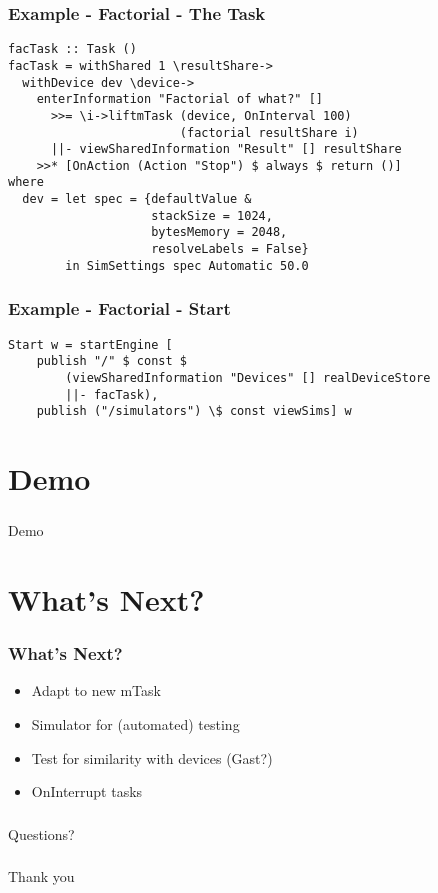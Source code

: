 \documentclass[department=icis, notes={show notes}, slidesperpage=1, official=true,showdate=true,slidenumbers=relative]{beamerruhuisstijl}
\begin{document}
\begin{frame}[fragile]
  \frametitle{Example - Factorial - The Task}
  \begin{lstlisting}
facTask :: Task ()
facTask = withShared 1 \resultShare->
  withDevice dev \device->
    enterInformation "Factorial of what?" []
      >>= \i->liftmTask (device, OnInterval 100)
                        (factorial resultShare i)
      ||- viewSharedInformation "Result" [] resultShare
    >>* [OnAction (Action "Stop") $ always $ return ()]
where
  dev = let spec = {defaultValue & 
                    stackSize = 1024, 
                    bytesMemory = 2048, 
                    resolveLabels = False}
        in SimSettings spec Automatic 50.0
    \end{lstlisting}
\end{frame}

\begin{frame}[fragile]
  \frametitle{Example - Factorial - Start}
  \begin{lstlisting}
Start w = startEngine [
    publish "/" $ const $ 
        (viewSharedInformation "Devices" [] realDeviceStore 
        ||- facTask),
    publish ("/simulators") \$ const viewSims] w
    \end{lstlisting}
\end{frame}

\section{Demo}
\begin{frame}[plain,c]
  \frametitle{}
  \begin{center}
    \Huge Demo
  \end{center}
\end{frame}

\section{What's Next?}
\begin{frame}[fragile]
  \frametitle{What's Next?}
  \begin{itemize}
      \setlength\itemsep{1em}
      \item Adapt to new mTask
      \item Simulator for (automated) testing
      \item Test for similarity with devices (Gast?)
      \item OnInterrupt tasks 
  \end{itemize}
\end{frame}

\begin{frame}[plain,c]
  \frametitle{}
  \begin{center}
    \Huge Questions?
  \end{center}
\end{frame}


\begin{frame}[plain,c]
  \frametitle{}

  \begin{center}
    \Huge Thank you
  \end{center}
\end{frame}
\end{document}
